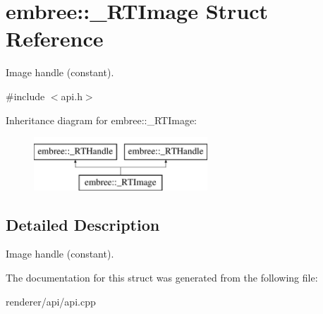 \hypertarget{structembree_1_1___r_t_image}{
\section{embree::\_\-RTImage Struct Reference}
\label{structembree_1_1___r_t_image}
}


Image handle (constant).  




{\ttfamily \#include $<$api.h$>$}

Inheritance diagram for embree::\_\-RTImage:\begin{figure}[H]
\begin{center}
\leavevmode
\includegraphics[height=2.000000cm]{structembree_1_1___r_t_image}
\end{center}
\end{figure}


\subsection{Detailed Description}
Image handle (constant). 

The documentation for this struct was generated from the following file:\begin{DoxyCompactItemize}
\item 
renderer/api/api.cpp\end{DoxyCompactItemize}
